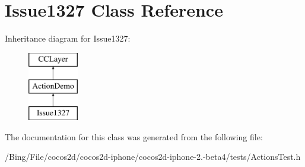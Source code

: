 \hypertarget{interface_issue1327}{\section{Issue1327 Class Reference}
\label{interface_issue1327}
}
Inheritance diagram for Issue1327\-:\begin{figure}[H]
\begin{center}
\leavevmode
\includegraphics[height=3.000000cm]{interface_issue1327}
\end{center}
\end{figure}


The documentation for this class was generated from the following file\-:\begin{DoxyCompactItemize}
\item 
/\-Bing/\-File/cocos2d/cocos2d-\/iphone/cocos2d-\/iphone-\/2.-\/beta4/tests/Actions\-Test.\-h\end{DoxyCompactItemize}
